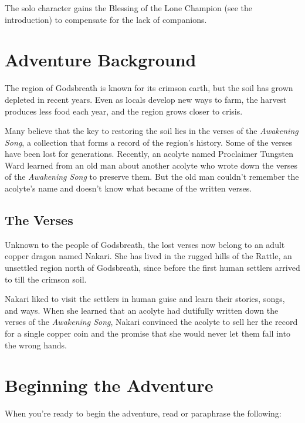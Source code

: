 \documentclass[letterpaper, 11pt, twocolumn]{dndbook}
\begin{document}
The solo character gains the Blessing of the Lone Champion (see the introduction) to compensate for the lack of companions.
\section{Adventure Background}

The region of Godsbreath is known for its crimson earth, but the soil has grown depleted in recent years. Even as locals develop new ways to farm, the harvest produces less food each year, and the region grows closer to crisis.

Many believe that the key to restoring the soil lies in the verses of the \textit{Awakening Song}, a collection that forms a record of the region's history. Some of the verses have been lost for generations. Recently, an acolyte named Proclaimer Tungsten Ward learned from an old man about another acolyte who wrote down the verses of the \textit{Awakening Song} to preserve them. But the old man couldn't remember the acolyte's name and doesn't know what became of the written verses.

\subsection{The Verses}

Unknown to the people of Godsbreath, the lost verses now belong to an adult copper dragon named Nakari. She has lived in the rugged hills of the Rattle, an unsettled region north of Godsbreath, since before the first human settlers arrived to till the crimson soil.

Nakari liked to visit the settlers in human guise and learn their stories, songs, and ways. When she learned that an acolyte had dutifully written down the verses of the \textit{Awakening Song}, Nakari convinced the acolyte to sell her the record for a single copper coin and the promise that she would never let them fall into the wrong hands.
\section{Beginning the Adventure}

When you're ready to begin the adventure, read or paraphrase the following:
\end{document}
